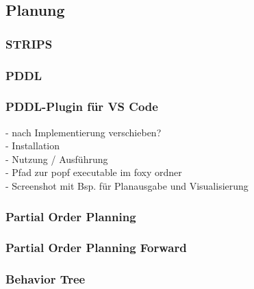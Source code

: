 \subsection {Planung}
\subsubsection{STRIPS}
\subsubsection{PDDL}
\subsubsection{PDDL-Plugin für VS Code}
- nach Implementierung verschieben?\\
- Installation\\
- Nutzung / Ausführung\\
- Pfad zur popf executable im foxy ordner\\
- Screenshot mit Bsp. für Planausgabe und Visualisierung\\
\subsubsection{Partial Order Planning}
\subsubsection{Partial Order Planning Forward}
\citep{popf}
\subsubsection{Behavior Tree}

\newpage